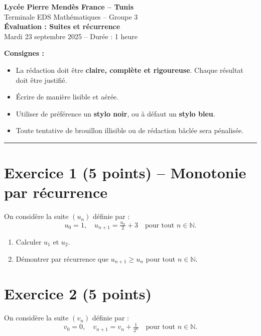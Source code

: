 \documentclass[12pt,a4paper]{article}
\begin{document}
\begin{center}
\Large\textbf{Lycée Pierre Mendès France -- Tunis}\\[0.2cm]
\large Terminale EDS Mathématiques -- Groupe 3 \\[0.2cm]
\large \textbf{Évaluation : Suites et récurrence}\\[0.2cm]
Mardi 23 septembre 2025 -- Durée : 1 heure
\end{center}

\vspace{0.5cm}

\noindent\textbf{Consignes :}
\begin{itemize}
    \item La rédaction doit être \textbf{claire, complète et rigoureuse}. Chaque résultat doit être justifié.
    \item Écrire de manière lisible et aérée.
    \item Utiliser de préférence un \textbf{stylo noir}, ou à défaut un \textbf{stylo bleu}.
    \item Toute tentative de brouillon illisible ou de rédaction bâclée sera pénalisée.
\end{itemize}

\vspace{0.5cm}

\hrule
\vspace{0.5cm}

\section*{Exercice 1 (5 points) -- Monotonie par récurrence}
On considère la suite $(u_n)$ définie par :
\[
u_0 = 1, \quad u_{n+1} = \tfrac{u_n}{2} + 3 \quad \text{pour tout } n \in \mathbb{N}.
\]

\begin{enumerate}
    \item Calculer $u_1$ et $u_2$.
    \item Démontrer par récurrence que $u_{n+1} \geq u_n$ pour tout $n \in \mathbb{N}$.
\end{enumerate}

\vspace{0.5cm}

\section*{Exercice 2 (5 points)}
On considère la suite $(v_n)$ définie par :
\[
v_0 = 0, \quad v_{n+1} = v_n + \tfrac{1}{2^n} \quad \text{pour tout } n \in \mathbb{N}.
\]
\end{document}
